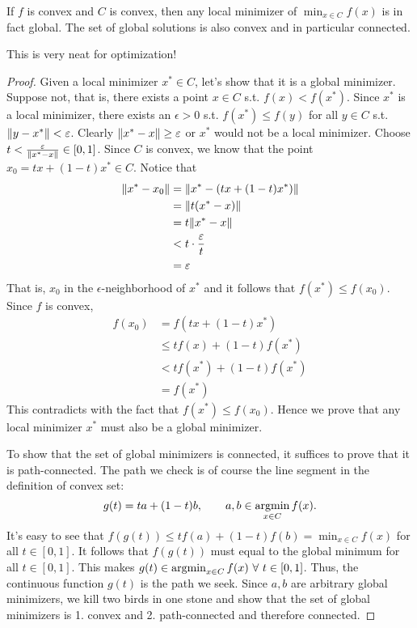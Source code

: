 \documentclass[class=article,crop=false]{standalone}
\begin{document}
\begin{thm}
	If $ f$ is convex and  $ C$ is convex, then any local minimizer of  $ \min_{x \in C } f(x)$ is in fact global. The set of global solutions is also convex and in particular connected.
\end{thm}
This is very neat for optimization!
\begin{proof}
	Given a local minimizer $ x^* \in C$, let's show that it is a global minimizer. Suppose not, that is, there exists a point $ x \in C $ s.t. $ f(x) < f(x^* )$. Since $ x^* $ is a local minimizer, there exists an $ \epsilon>0$ s.t. $ f(x^* ) \leq f(y)$ for all $ y \in C$ s.t. ${\left\lVert{ y -x^* }\right\rVert}< \varepsilon $. Clearly $ {\left\lVert{ x^* -x}\right\rVert} \geq \varepsilon$ or $ x^* $ would not be a local minimizer. Choose $ t < \frac{ \varepsilon}{ {\left\lVert{ x^* -x }\right\rVert} } \in [0,1]$. Since $ C$ is convex, we know that the point $ x_0 = t x + (1-t)x^*  \in C$. Notice that
\begin{align*}
	{\left\lVert{ x^* -x_0}\right\rVert} &={\left\lVert{ x^* - (t x+ ( 1-t) x^* )  }\right\rVert}\\
			 &= {\left\lVert{ t (x^* - x) }\right\rVert}  \\
					 &= t {\left\lVert{ x^* -x}\right\rVert}   \\
					 &< t \cdot \frac{ \varepsilon}{ t } \\
					 &= \varepsilon 
\end{align*}
That is, $ x_0$ in the $ \epsilon$-neighborhood of $ x^* $ and it follows that $ f(x^* ) \leq f(x_0)$. 
	Since $ f$ is convex,
	\begin{align*}
		f(x_0) &= f(t x + (1-t) x^* ) \\
		       &\leq t f(x) + (1-t) f(x^* )\\
		       &< tf(x^* ) + (1-t) f(x^* )\\
		       &= f(x^* )
	\end{align*}
	This contradicts with the fact that $ f(x^* ) \leq f(x_0)$. Hence we prove that any local minimizer $ x^* $ must also be a global minimizer.

	To show that the set of global minimizers is connected, it suffices to prove that it is path-connected. The path we check is of course the line segment in the definition of convex set:
\[
	g(t) = t a + (1-t) b, \qquad a, b \in \operatorname*{argmin}_{x \in C} f(x)
.\] 
It's easy to see that $ f(g(t)) \leq tf(a)+(1-t)f(b) = \min_{x \in C} f(x)$ for all $ t \in [0,1]$. It follows that $ f(g(t))$ must equal to the global minimum for all $ t \in [0,1]$. This makes $ g(t) \in \argmin_{x \in C} f(x) \ \forall \ t \in [0,1]$. Thus, the continuous function $ g(t)$ is the path we seek. Since $ a,b$ are arbitrary global minimizers, we kill two birds in one stone and show that the set of global minimizers is 1. convex and 2. path-connected and therefore connected.
\end{proof}
\newpage
\end{document}

